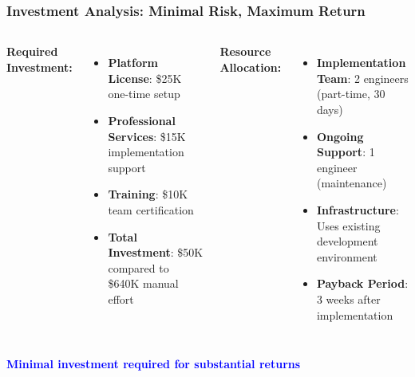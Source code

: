 \begin{frame}
\frametitle{Investment Analysis: Minimal Risk, Maximum Return}
\begin{columns}
\textbf{Required Investment:}
\begin{itemize}
    \item \textbf{Platform License}: \$25K one-time setup
    \item \textbf{Professional Services}: \$15K implementation support
    \item \textbf{Training}: \$10K team certification
    \item \textbf{Total Investment}: \$50K compared to \$640K manual effort
\end{itemize}

\textbf{Resource Allocation:}
\begin{itemize}
    \item \textbf{Implementation Team}: 2 engineers (part-time, 30 days)
    \item \textbf{Ongoing Support}: 1 engineer (maintenance)
    \item \textbf{Infrastructure}: Uses existing development environment
    \item \textbf{Payback Period}: 3 weeks after implementation
\end{itemize}
\end{columns}

\vspace{0.3cm}
\begin{center}
\textcolor{blue}{\textbf{Minimal investment required for substantial returns}}
\end{center}
\end{frame}

